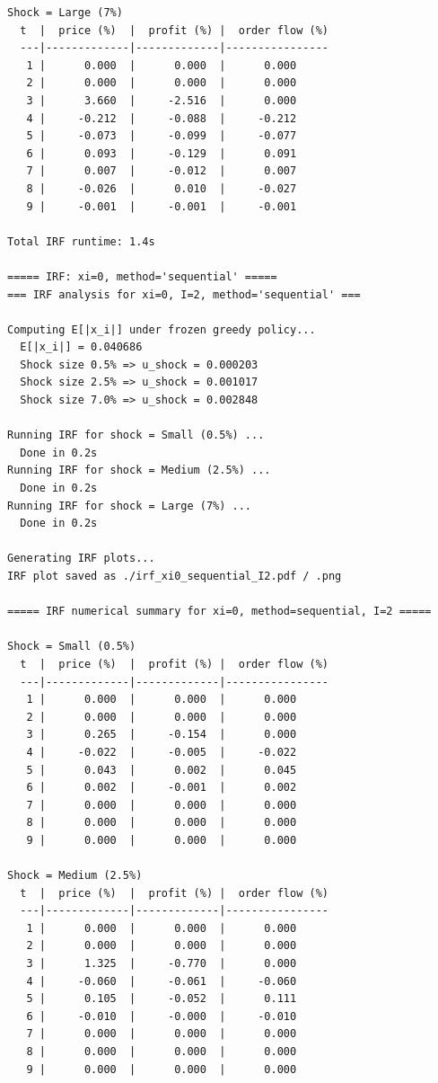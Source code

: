 \begin{lstlisting}[style=outputstyle]
Shock = Large (7%)
  t  |  price (%)  |  profit (%) |  order flow (%)
  ---|-------------|-------------|----------------
   1 |      0.000  |      0.000  |      0.000
   2 |      0.000  |      0.000  |      0.000
   3 |      3.660  |     -2.516  |      0.000
   4 |     -0.212  |     -0.088  |     -0.212
   5 |     -0.073  |     -0.099  |     -0.077
   6 |      0.093  |     -0.129  |      0.091
   7 |      0.007  |     -0.012  |      0.007
   8 |     -0.026  |      0.010  |     -0.027
   9 |     -0.001  |     -0.001  |     -0.001

Total IRF runtime: 1.4s

===== IRF: xi=0, method='sequential' =====
=== IRF analysis for xi=0, I=2, method='sequential' ===

Computing E[|x_i|] under frozen greedy policy...
  E[|x_i|] = 0.040686
  Shock size 0.5% => u_shock = 0.000203
  Shock size 2.5% => u_shock = 0.001017
  Shock size 7.0% => u_shock = 0.002848

Running IRF for shock = Small (0.5%) ...
  Done in 0.2s
Running IRF for shock = Medium (2.5%) ...
  Done in 0.2s
Running IRF for shock = Large (7%) ...
  Done in 0.2s

Generating IRF plots...
IRF plot saved as ./irf_xi0_sequential_I2.pdf / .png

===== IRF numerical summary for xi=0, method=sequential, I=2 =====

Shock = Small (0.5%)
  t  |  price (%)  |  profit (%) |  order flow (%)
  ---|-------------|-------------|----------------
   1 |      0.000  |      0.000  |      0.000
   2 |      0.000  |      0.000  |      0.000
   3 |      0.265  |     -0.154  |      0.000
   4 |     -0.022  |     -0.005  |     -0.022
   5 |      0.043  |      0.002  |      0.045
   6 |      0.002  |     -0.001  |      0.002
   7 |      0.000  |      0.000  |      0.000
   8 |      0.000  |      0.000  |      0.000
   9 |      0.000  |      0.000  |      0.000

Shock = Medium (2.5%)
  t  |  price (%)  |  profit (%) |  order flow (%)
  ---|-------------|-------------|----------------
   1 |      0.000  |      0.000  |      0.000
   2 |      0.000  |      0.000  |      0.000
   3 |      1.325  |     -0.770  |      0.000
   4 |     -0.060  |     -0.061  |     -0.060
   5 |      0.105  |     -0.052  |      0.111
   6 |     -0.010  |     -0.000  |     -0.010
   7 |      0.000  |      0.000  |      0.000
   8 |      0.000  |      0.000  |      0.000
   9 |      0.000  |      0.000  |      0.000


\end{lstlisting}
